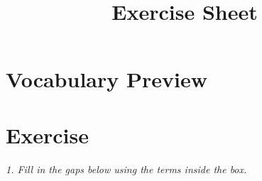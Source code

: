 \documentclass{exam}
\title{Exercise Sheet}
\begin{document}
\section{Vocabulary Preview}
\begin{CJK*}{UTF8}{gbsn}

%
%
%
%
%
%
%
%
%
%
%
%
%
%
%
%
%
%
%
%

	
\end{CJK*}


\newpage


%
%
%
%
%
%
%
%
%
%
%
%
%
%
%
%
%
%
%
%



\newpage
\section{Exercise}

\noindent \textit{1. Fill in the gaps below using the terms inside the box.}
\end{document}
